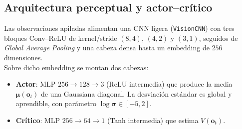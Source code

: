 \documentclass[conference]{IEEEtran}
\begin{document}
\subsection{Arquitectura perceptual y actor--crítico}
Las observaciones apiladas alimentan una CNN ligera (\texttt{VisionCNN}) con tres bloques
\mbox{Conv--ReLU} de kernel/stride $(8,4)$, $(4,2)$ y $(3,1)$, seguidos de \emph{Global Average Pooling} y una cabeza densa hasta un embedding de $256$ dimensiones.\\
Sobre dicho embedding se montan dos cabezas:
\begin{itemize}
    \item \textbf{Actor}: MLP $256{\to}128{\to}3$ (ReLU intermedia) que produce la media $\boldsymbol\mu(\mathbf{o}_t)$ de una Gaussiana diagonal. La desviación estándar es global y aprendible, con parámetro $\log\boldsymbol\sigma \in [-5,2]$.
    \item \textbf{Crítico}: MLP $256{\to}64{\to}1$ (Tanh intermedia) que estima $V(\mathbf{o}_t)$.
\end{itemize}
\end{document}
